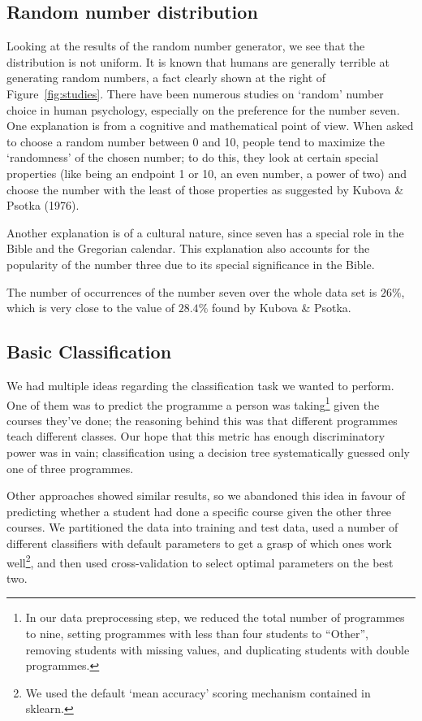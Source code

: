 \documentclass[runningheads,a4paper]{llncs}
\begin{document}
\subsection{Random number distribution}
Looking at the results of the random number generator, we see that the
distribution is not uniform.  It is known that humans are generally terrible at
generating random numbers, a fact clearly shown at the right of Figure~\ref{fig:studies}. There
have been numerous studies on `random' number choice in human psychology,
especially on the preference for the number seven.  One explanation is
from a cognitive and mathematical point of view. When asked to choose a random
number between 0 and 10, people tend to maximize the `randomness' of the chosen
number; to do this, they look at certain special properties (like being an endpoint
1 or 10, an even number, a power of two) and choose the number with the least of
those properties as suggested by Kubova \& Psotka (1976). \cite{seven}

Another explanation is of a cultural nature, since seven has a special role in the
Bible and the Gregorian calendar. This explanation also accounts for the
popularity of the number three due to its special significance in the Bible.

The number of occurrences of the number seven over the whole data set is $26\%$,
which is very close to the value of $28.4\%$ found by Kubova \& Psotka.

\subsection{Basic Classification}
We had multiple ideas regarding the classification task we wanted to perform.  
One of them was to predict the programme a person was taking\footnote{In our 
data preprocessing step, we reduced the total number of programmes to nine, 
setting programmes with less than four students to ``Other'', removing students 
with missing values, and duplicating students with double programmes.} given 
the courses they've done; the reasoning behind this was that different 
programmes teach different classes.  Our hope that this metric has enough 
discriminatory power was in vain; classification using a decision tree 
systematically guessed only one of three programmes.  

Other approaches showed similar results, so we abandoned this idea in favour of 
predicting whether a student had done a specific course given the other three 
courses.  We partitioned the data into training and test data, used a number of 
different classifiers with default parameters to get a grasp of which ones work 
well\footnote{We used the default `mean accuracy' scoring mechanism contained 
in sklearn.}, and then used cross-validation to select optimal parameters on 
the best two.
\end{document}

